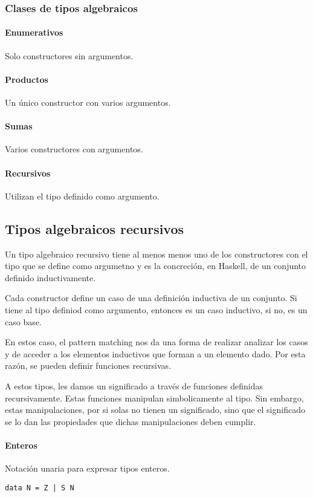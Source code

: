 \documentclass[10pt,a4paper]{article}
\begin{document}
\subsubsection{Clases de tipos algebraicos}

\paragraph{Enumerativos} Solo constructores sin argumentos.

\paragraph{Productos} Un único constructor con varios argumentos.

\paragraph{Sumas} Varios constructores con argumentos.

\paragraph{Recursivos} Utilizan el tipo definido como argumento.

\subsection{Tipos algebraicos recursivos}
Un tipo algebraico recursivo tiene al menos menos uno de los constructores con el tipo que se define como argumetno y es la concreción, en Haskell, de un conjunto definido inductivamente.

Cada constructor define un caso de una definición inductiva de un conjunto. Si tiene al tipo definiod como argumento, entonces es un caso inductivo, si no, es un caso base.

En estos caso, el pattern matching nos da una forma de realizar analizar los casos y de acceder a los elementos inductivos que forman a un elemento dado. Por esta razón, se pueden definir funciones recursivas.

A estos tipos, les damos un significado a través de funciones definidas recursivamente. Estas funciones manipulan simbolicamente al tipo. Sin embargo, estas manipulaciones, por si solas no tienen un significado, sino que el significado se lo dan las propiedades que dichas manipulaciones deben cumplir.

\paragraph{Enteros} Notación unaria para expresar tipos enteros.
\begin{centrado}
	\begin{verbatim}
data N = Z | S N
	\end{verbatim}
\end{centrado}
\end{document}
